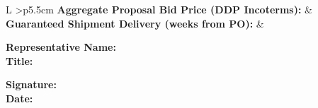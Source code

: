 \vspace{0.3cm}
\begin{tcolorbox}[rfqbox, title=Financial Sourcing Summary, colback=white]
\begin{tabularx}{\textwidth}{L >{\raggedleft\arraybackslash}p{5.5cm}}
    \textbf{Aggregate Proposal Bid Price (DDP Incoterms):} & \underline{\hspace{5cm}} \\
    \textbf{Guaranteed Shipment Delivery (weeks from PO):} & \underline{\hspace{5cm}} \\
\end{tabularx}

\vspace{0.8cm}
\begin{minipage}[t]{0.48\textwidth}
    \vspace{0pt}
    \textbf{Representative Name:} \underline{\hspace{3.5cm}} \\[0.5cm]
    \textbf{Title:} \underline{\hspace{5.4cm}}
\end{minipage}%
\hfill
\begin{minipage}[t]{0.48\textwidth}
    \vspace{0pt}
    \textbf{Signature:} \underline{\hspace{4.7cm}} \\[0.5cm]
    \textbf{Date:} \underline{\hspace{5.4cm}}
\end{minipage}
\end{tcolorbox}
